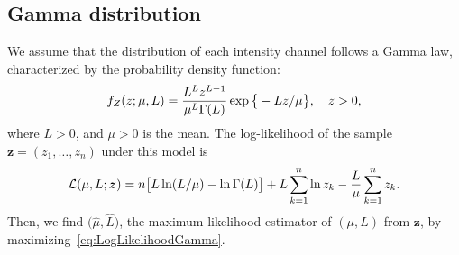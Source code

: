 \documentclass{article}
\DeclareMathOperator{\Tr}{Tr}
\begin{document}
\subsection{Gamma distribution}\vspace{-0.1cm}
We assume that the distribution of each intensity channel  follows a Gamma law, characterized by the probability density function:
\vspace{-0.3cm}
\begin{equation}
f_Z(z;\mu,L)=\frac{L^{L}z^{L-1}}{\mu^{L}\Gamma(L)} \exp\big\{-Lz/\mu\big\},\quad z>0,
\label{func_dens_uni_gamma}\vspace{-0.2cm}
\end{equation}
where $L>0$, and
$\mu>0$ is the mean.
The log-likelihood of the sample $\bm{z} = (z_1,\dots,z_n)$ under this model is
\vspace{-0.3cm}
\begin{equation}
\mathcal{L}(\mu, L; \bm{z}) = 
n \big[L\ln (L / \mu) - \ln \Gamma(L)\big]
+L \sum_{k=1}^{n}\ln z_k -\frac{L}{\mu}\sum_{k=1}^{n} z_k.
\label{eq:LogLikelihoodGamma}\vspace{-0.3cm}
\end{equation}
Then, we find $\big(\widehat \mu, \widehat L\big)$, the maximum likelihood estimator of $(\mu, L)$ from $\bm{z}$, by maximizing~\eqref{eq:LogLikelihoodGamma}.\vspace{-0.2cm}
\end{document}
